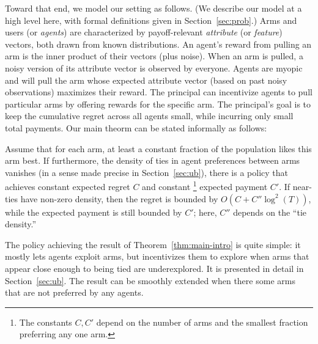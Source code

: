 
Toward that end, we model our setting as follows.
(We describe our model at a high level here,
with formal definitions given in Section~\ref{sec:prob}.)
Arms and users (or \emph{agents}) are characterized by payoff-relevant
\emph{attribute} (or \emph{feature}) vectors,
both drawn from known distributions.
An agent's reward from pulling an arm is the inner product of their
vectors (plus noise).
When an arm is pulled, a noisy version of its attribute vector is
observed by everyone.
Agents are myopic and will pull the arm whose expected attribute
vector (based on past noisy observations) maximizes their reward.
The principal can incentivize agents to pull particular arms by
offering rewards for the specific arm.
The principal's goal is to keep the cumulative regret across all
agents small, while incurring only small total payments.
Our main theorm can be stated informally as follows:

\begin{theorem} \label{thm:main-intro}
Assume that for each arm, at least a constant fraction of the
population likes this arm best.
If furthermore, the density of ties in agent preferences between arms
vanishes (in a sense made precise in Section~\ref{sec:ub}),
there is a policy that achieves constant
expected regret $C$ and constant%
\footnote{The constants $C,C'$ depend on the number of arms and the
  smallest fraction preferring any one arm.} expected payment $C'$.
If near-ties have non-zero density,
then the regret is bounded by $O(C + C'' \log^2(T))$,
while the expected payment is still bounded by $C'$;
here, $C''$ depends on the ``tie density.''
\end{theorem}

The policy achieving the result of Theorem~\ref{thm:main-intro} is
quite simple: it mostly lets agents exploit arms, but incentivizes
them to explore when arms that appear close enough to being tied are
underexplored. It is presented in detail in Section~\ref{sec:ub}.
The result can be smoothly extended when there some arms that are not
preferred by any agents.
